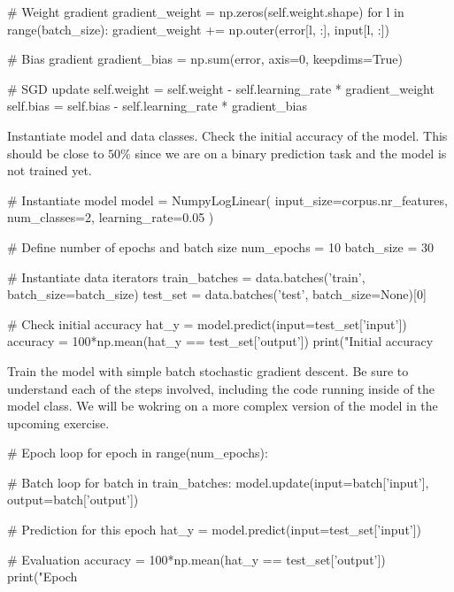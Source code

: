 \begin{exercise}
\begin{python}
        # Weight gradient
        gradient_weight = np.zeros(self.weight.shape)
        for l in range(batch_size):
            gradient_weight += np.outer(error[l, :], input[l, :])

        # Bias gradient
        gradient_bias = np.sum(error, axis=0, keepdims=True)

        # SGD update
        self.weight = self.weight - self.learning_rate * gradient_weight
        self.bias = self.bias - self.learning_rate * gradient_bias
\end{python}
Instantiate model and data classes. Check the initial accuracy of the model. This should be close to $50\%$ since we are on a binary prediction task and the model is not trained yet.
\begin{python}
# Instantiate model
model = NumpyLogLinear(
    input_size=corpus.nr_features,
    num_classes=2,
    learning_rate=0.05
)

# Define number of epochs and batch size
num_epochs = 10
batch_size = 30

# Instantiate data iterators
train_batches = data.batches('train', batch_size=batch_size)
test_set = data.batches('test', batch_size=None)[0]

# Check initial accuracy
hat_y = model.predict(input=test_set['input'])
accuracy = 100*np.mean(hat_y == test_set['output'])
print("Initial accuracy %

\end{python}
Train the model with simple batch stochastic gradient descent. Be sure to understand each of the steps involved, including the code running inside of the model class. We will be wokring on a more complex version of the model in the upcoming exercise.
\begin{python}
# Epoch loop
for epoch in range(num_epochs):

    # Batch loop
    for batch in train_batches:
        model.update(input=batch['input'], output=batch['output'])

    # Prediction for this epoch
    hat_y = model.predict(input=test_set['input'])

    # Evaluation
    accuracy = 100*np.mean(hat_y == test_set['output'])
    print("Epoch %
\end{python}

\end{exercise}




